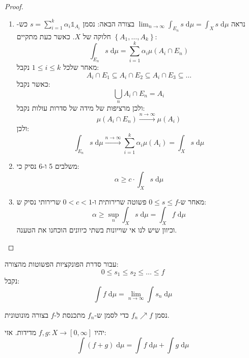 \documentclass{tstextbook}
\begin{document}
\begin{proof}
\begin{enumerate}
    \item נראה \(\lim_{ n \to \infty }\int _{E_{n}}s \;\mathrm{d} \mu=\int _{X}s \;\mathrm{d} \mu\) בצורה הבאה: 
נסמן \(s=\sum_{i=1}^{k}\alpha_{i}\mathbb{1}_{A_{i}}\) כש-\(\left\{  A_{1},\dots,A_{k}  \right\}\) חלוקה של \(X\). כאשר כעת מתקיים:
$$\int _{E_{n}}s \;\mathrm{d} \mu = \sum_{i=1}^{k}  \alpha_{i}\mu\left( A_{i}\cap E_{n} \right) $$
מאחר שלכל \(1\leq i \leq k\) נקבל:
$$A_{i}\cap E_{1}\subseteq A_{i}\cap E_{2}\subseteq A_{i}\cap E_{3}\subseteq \dots$$
כאשר נקבל:
$$\bigcup_{n}A_{i}\cap E_{n}=A_{i}$$
ולכן מרציפות של מידה של סדרות עולות נקבל:
$$\mu\left( A_{i}\cap E_{n} \right)\xrightarrow{n\to \infty} \mu(A_{i})$$
ולכן:
$$\int _{E_{n}} s\;\mathrm{d} \mu \xrightarrow{n\to\infty } \sum_{i=1}^{k}\alpha_{i}\mu(A_{i})=\int _{X}s \;\mathrm{d} \mu  $$


    \item משלבים 5 ו-6 נסיק כי: 
$$\alpha \geq c \cdot \int _{X} s  \;\mathrm{d} \mu $$


    \item מאחר ש-\(0\leq s\leq f\) פשוטה שרירותית ו-\(0< c < 1\) שרירותי נסיק ש: 
$$\alpha \geq \sup_{n}  \int_{X} s \;\mathrm{d} \mu =\int _{X}f \;\mathrm{d} \mu$$
וכיוון שיש לנו אי שוייונות בשתי כיוונים הוכחנו את הטענה.


  \end{enumerate}
\end{proof}
\begin{corollary}
עבור סדרת הפונקציות הפשוטות מהצורה:
$$0\leq s_{1}\leq s_{2} \leq\dots \leq f$$
נקבל:
$$\int f \;\mathrm{d} \mu =\lim_{ n \to \infty } \int s_{n} \;\mathrm{d} \mu $$

\end{corollary}
\begin{symbolize}
נסמן \(f_{n}\nearrow f\) כדי לסמן ש-\(f_{n}\) מתכנסת ל-\(f\) בצורה מונוטונית.

\end{symbolize}
\begin{lemma}
יהיו \(f,g:X\to\left[ 0,\infty \right]\) מדידות. אזי:
$$\int (f+g) \;\mathrm{d} \mu = \int f \;\mathrm{d} \mu+\int  g \;\mathrm{d} \mu   $$

\end{lemma}
\end{document}
